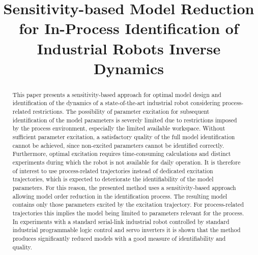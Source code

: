 \documentclass[conference,letterpaper]{IEEEtran}
\begin{document}
\title{Sensitivity-based Model Reduction for In-Process Identification of Industrial Robots Inverse Dynamics}

\author{
}

\maketitle

\begin{abstract}
This paper presents a sensitivity-based approach for optimal model design and identification of the dynamics of a state-of-the-art industrial robot considering process-related restrictions.
The possibility of parameter excitation for subsequent identification of the model parameters is severely limited due to restrictions imposed by the process environment, especially the limited available workspace. 
Without sufficient parameter excitation, a satisfactory quality of the full model identification cannot be achieved, since non-excited parameters cannot be identified correctly.  
Furthermore, optimal excitation requires time-consuming calculations and distinct experiments during which the robot is not available for daily operation. 
It is therefore of interest to use process-related trajectories instead of dedicated excitation trajectories, which is expected to deteriorate the identifiability of the model parameters.
For this reason, the presented method uses a sensitivity-based approach allowing model order reduction in the identification process. The resulting model contains only those parameters excited by the excitation trajectory. For process-related trajectories this implies the model being limited to parameters relevant for the process. 
In experiments with a standard serial-link industrial robot controlled by standard industrial programmable logic control and servo inverters it is shown that the method produces significantly reduced models with a good measure of identifiability and quality.
\end{abstract}
\end{document}
